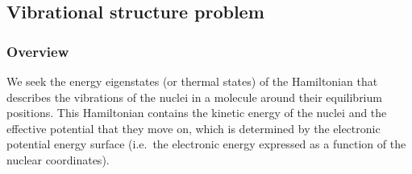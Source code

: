 \newpage





\begin{refsection}

\subsection{Vibrational structure problem}\label{appl:VibrationalStructure}


\subsubsection*{Overview}
We seek the energy eigenstates (or thermal states) of the Hamiltonian that describes the vibrations of the nuclei in a molecule around their equilibrium positions. This Hamiltonian contains the kinetic energy of the nuclei and the effective potential that they move on, which is determined by the electronic potential energy surface (i.e.~the electronic energy expressed as a function of the nuclear coordinates). 



\end{refsection}
